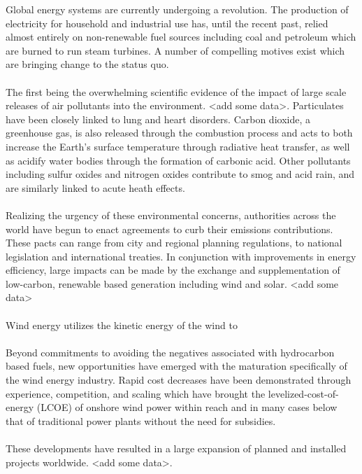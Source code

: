 Global energy systems are currently undergoing a revolution. The production of electricity for household and industrial use has, until the recent past, relied almost entirely on non-renewable fuel sources including coal and petroleum which are burned to run steam turbines. A number of compelling motives exist which are bringing change to the status quo.
\\\\
The first being the overwhelming scientific evidence of the impact of large scale releases of air pollutants into the environment. <add some data>. Particulates have been closely linked to lung and heart disorders. Carbon dioxide, a greenhouse gas, is also released through the combustion process and acts to both increase the Earth's surface temperature through radiative heat transfer, as well as acidify water bodies through the formation of carbonic acid. Other pollutants including sulfur oxides and nitrogen oxides contribute to smog and acid rain, and are similarly linked to acute heath effects. 
\\\\
Realizing the urgency of these environmental concerns, authorities across the world have begun to enact agreements to curb their emissions contributions. These pacts can range from city and regional planning regulations, to national legislation and international treaties. In conjunction with improvements in energy efficiency, large impacts can be made by the exchange and supplementation of low-carbon, renewable based generation including wind and solar. <add some data>
\\\\
Wind energy utilizes the kinetic energy of the wind to 
\\\\
Beyond commitments to avoiding the negatives associated with hydrocarbon based fuels, new opportunities have emerged with the maturation specifically of the wind energy industry. Rapid cost decreases have been demonstrated through experience, competition, and scaling which have brought the levelized-cost-of-energy (LCOE) of onshore wind power within reach and in many cases below that of traditional power plants without the need for subsidies.
\\\\
These developments have resulted in a large expansion of planned and installed projects worldwide. <add some data>. 


\clearpage
